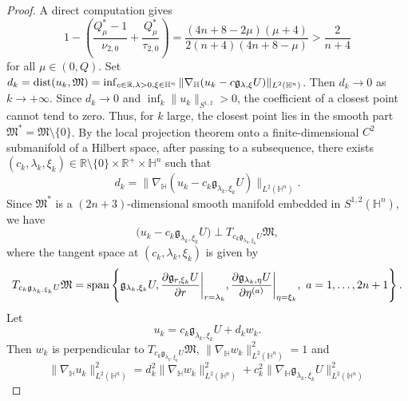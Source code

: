 \documentclass[11pt]{article}
\begin{document}
\begin{proof}
{A direct computation gives}
\begin{equation*}
 1-\left(\frac{Q^{\ast}_{\mu}-1}{\nu_{2,0}}+\frac{Q^{\ast}_{\mu}}{\tau_{2,0}}\right)=\frac{(4n+8-2\mu)(\mu+4)}{2(n+4)(4n+8-\mu)}>\frac{2}{n+4}
\end{equation*}
for all $\mu\in (0,Q)$.
{Set $d_k={\rm dist}(u_k,\mathfrak{M})=\inf_{c\in \mathbb{R},\lambda>0,\xi\in \mathbb{H}^n}\|\nabla_\mathbb{H}(u_k-c\mathfrak{g}_{\lambda,\xi}U)\|_{L^{2}(\mathbb{H}^{n})}$. Then $d_k\to0$ as $k\to+\infty$.}
Since $d_k\to0$ and $\inf_k\|u_k\|_{S^{1,2}}>0$, the coefficient of a closest point cannot tend to zero. Thus, for $k$ large, the closest point lies in the smooth part $\mathfrak{M}^*=\mathfrak{M}\setminus \{0\}$. By the local projection theorem onto a finite-dimensional $C^2$ submanifold of a Hilbert space, after passing to a subsequence, there exists $(c_k,\lambda_k,\xi_k)\in \mathbb{R}\setminus \{0\}\times\mathbb{R}^+\times\mathbb{H}^n$ such that
\begin{equation*}
 d_k=\big\|\nabla_\mathbb{H}(u_k-c_k\mathfrak{g}_{\lambda_k,\xi_k}U)\big\|_{{L}^{2}(\mathbb{H}^n)}.
\end{equation*}
{Since $\mathfrak M^*$ is a $(2n+3)$-dimensional smooth manifold embedded in $S^{1,2}(\mathbb H^n)$,}
we have
 \begin{equation*}
 \big(u_k-c_k\mathfrak{g}_{\lambda_k,\xi_k}U\big)\perp T_{c_k\mathfrak{g}_{\lambda_k,\xi_k}U}\mathfrak{M},
 \end{equation*}
 where the tangent space at $(c_k,\lambda_k,\xi_k)$ is given by
 \begin{equation*}
 T_{c_k\mathfrak{g}_{\lambda_k,\xi_k}U}\mathfrak{M}={\rm span}\left\{\mathfrak{g}_{\lambda_k,\xi_k}U, \frac{\partial \mathfrak{g}_{r,\xi_k}U}{\partial r}\bigg|_{r=\lambda_k},\frac{\partial \mathfrak{g}_{\lambda_k,\eta}U}{\partial \eta^{(a)}}\bigg|_{\eta=\xi_k},~a=1,\ldots,2n+1
 \right\}.
 \end{equation*}
 Let
 \begin{equation*}
 u_k=c_k\mathfrak{g}_{\lambda_k,\xi_k}U+d_k w_k.
 \end{equation*}
 {Then $w_k$ is perpendicular to $T_{c_k\mathfrak{g}_{\lambda_k,\xi_k}U}\mathfrak{M}$,} $\|\nabla_\mathbb{H}w_k\|^2_{L^{2}(\mathbb{H}^n)}=1$ and
 \begin{equation*}
 \|\nabla_\mathbb{H}u_k\|^2_{L^{2}(\mathbb{H}^n)}=d_k^2\|\nabla_\mathbb{H}w_k\|
 _{L^{2}(\mathbb{H}^n)}^2+c_k^2\|\nabla_\mathbb{H}\mathfrak{g}_{\lambda_k,\xi_k}U\|^2_
 {L^{2}(\mathbb{H}^n)}

\end{equation*}
\end{proof}
\end{document}
